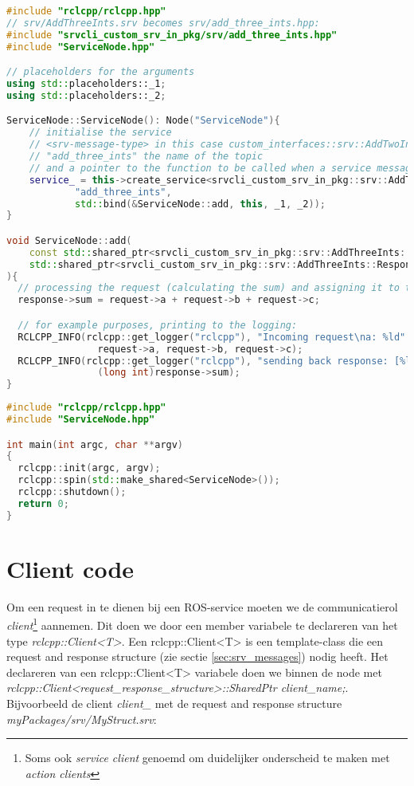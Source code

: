 \begin{lstlisting}[language=C++, caption={ServiceNode.cpp}, firstnumber=0, label={code:server_cpp}]
#include "rclcpp/rclcpp.hpp"
// srv/AddThreeInts.srv becomes srv/add_three_ints.hpp:
#include "srvcli_custom_srv_in_pkg/srv/add_three_ints.hpp"
#include "ServiceNode.hpp"

// placeholders for the arguments
using std::placeholders::_1;
using std::placeholders::_2;

ServiceNode::ServiceNode(): Node("ServiceNode"){
    // initialise the service
    // <srv-message-type> in this case custom_interfaces::srv::AddTwoInts
    // "add_three_ints" the name of the topic
    // and a pointer to the function to be called when a service message is received.
    service_ = this->create_service<srvcli_custom_srv_in_pkg::srv::AddThreeInts>(
            "add_three_ints", 
            std::bind(&ServiceNode::add, this, _1, _2));
}

void ServiceNode::add(
    const std::shared_ptr<srvcli_custom_srv_in_pkg::srv::AddThreeInts::Request> request,
    std::shared_ptr<srvcli_custom_srv_in_pkg::srv::AddThreeInts::Response> response
){
  // processing the request (calculating the sum) and assigning it to the response:
  response->sum = request->a + request->b + request->c;

  // for example purposes, printing to the logging:
  RCLCPP_INFO(rclcpp::get_logger("rclcpp"), "Incoming request\na: %ld" " b: %ld" "c: %ld",
                request->a, request->b, request->c);
  RCLCPP_INFO(rclcpp::get_logger("rclcpp"), "sending back response: [%ld]", 
                (long int)response->sum);
}
\end{lstlisting}


\begin{lstlisting}[language=C++, caption={mainServer.cpp}, firstnumber=0, label={code:server_main}]
#include "rclcpp/rclcpp.hpp"
#include "ServiceNode.hpp"

int main(int argc, char **argv)
{
  rclcpp::init(argc, argv);
  rclcpp::spin(std::make_shared<ServiceNode>());
  rclcpp::shutdown();
  return 0;
}
\end{lstlisting}

\section{Client code}
Om een request in te dienen bij een ROS-service moeten we de communicatierol \textit{client}\footnote{Soms ook \textit{service client} genoemd om duidelijker onderscheid te maken met \textit{action clients}} aannemen. Dit doen we door een member variabele te declareren van het type \textit{rclcpp::Client<T>}. Een rclcpp::Client<T> is een template-class die een request and response structure (zie sectie \ref{sec:srv_messages}) nodig heeft. Het declareren van een rclcpp::Client<T> variabele doen we binnen de node met \textit{rclcpp::Client<request\_response\_structure>::SharedPtr client\_name;}. Bijvoorbeeld de client \textit{client\_} met de request and response structure \textit{myPackages/srv/MyStruct.srv}: 

